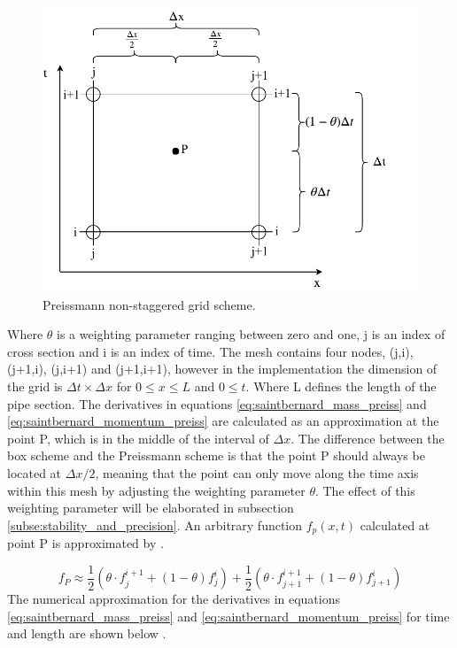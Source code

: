 \begin{figure}[H]
\centering
%
\includegraphics[width=.7\textwidth]{report/simulation/pictures/preissmann_scheme.pdf}
\caption{Preissmann non-staggered grid scheme.}
\label{fig:preissmann_grid_scheme}
\end{figure}

Where $\theta$ is a weighting parameter ranging between zero and one, j is an index of cross section and i is an index of time. The mesh contains four nodes, (j,i), (j+1,i), (j,i+1) and (j+1,i+1), however in the implementation the dimension of the grid is $\Delta t \times \Delta x$ for $0 \leq x \leq L$ and $0\leq t$. Where L defines the length of the pipe section. The derivatives in equations \ref{eq:saintbernard_mass_preiss} and \ref{eq:saintbernard_momentum_preiss} are calculated as an approximation at the point P, which is in the middle of the interval of $\Delta x$. The difference between the box scheme and the Preissmann scheme is that the point P should always be located at $\Delta x/2$, meaning that the point can only move along the time axis within this mesh by adjusting the weighting parameter $\theta$. The effect of this weighting parameter will be elaborated in subsection \ref{subse:stability_and_precision}.
 An arbitrary function $f_p(x,t)$ calculated at point P is approximated by \cite{szymkiewicz2010numerical}.

\begin{equation}\label{eq:approximated_function}
    f_P \approx \frac{1}{2} (\theta \cdot f_j^{i+1}+(1-\theta)f_j^i)+\frac{1}{2}(\theta\cdot f_{j+1}^{i+1}+(1-\theta)f_{j+1}^i)
\end{equation}
The numerical approximation for the derivatives in equations \ref{eq:saintbernard_mass_preiss} and \ref{eq:saintbernard_momentum_preiss} for time and length are shown below \cite{szymkiewicz2010numerical}.


